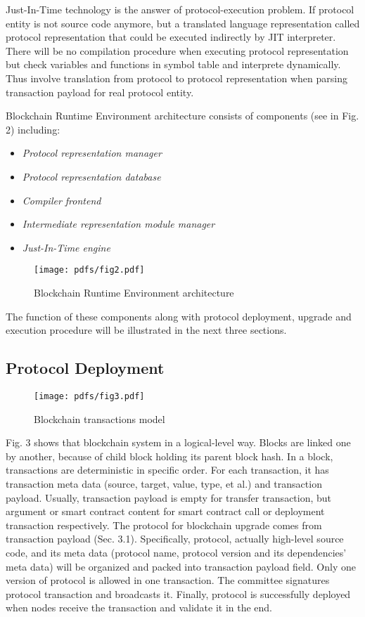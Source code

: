 \documentclass[sigplan,screen]{acmart}
\begin{document}
\begin{itemize}
    Just-In-Time technology is the answer of protocol-execution problem. If
    protocol entity is not source code anymore, but a translated language
    representation called protocol representation that could be executed
    indirectly by JIT interpreter. There will be no compilation procedure when
    executing protocol representation but check variables and functions in
    symbol table and interprete dynamically. Thus involve translation from
    protocol to protocol representation when parsing transaction payload for
    real protocol entity.
\end{itemize}

Blockchain Runtime Environment architecture consists of components (see in Fig.
2) including:
\begin{itemize}
  \item \textit{Protocol representation manager}
  \item \textit{Protocol representation database}
  \item \textit{Compiler frontend}
  \item \textit{Intermediate representation module manager}
  \item \textit{Just-In-Time engine}
\end{itemize}

\begin{figure}
  \texttt{[image: pdfs/fig2.pdf]}
  \caption{Blockchain Runtime Environment architecture}
\end{figure}

The function of these components along with protocol deployment, upgrade and
execution procedure will be illustrated in the next three sections.

\subsection{Protocol Deployment}

\begin{figure}
  \texttt{[image: pdfs/fig3.pdf]}
  \caption{Blockchain transactions model}
\end{figure}

Fig. 3 shows that blockchain system in a logical-level way. Blocks are linked
one by another, because of child block holding its parent block hash. In a
block, transactions are deterministic in specific order. For each transaction,
it has transaction meta data (source, target, value, type, et al.) and
transaction payload. Usually, transaction payload is empty for transfer
transaction, but argument or smart contract content for smart contract call
or deployment transaction respectively.
The protocol for blockchain upgrade comes from transaction payload
(Sec. 3.1). Specifically, protocol, actually high-level source
code, and its meta data (protocol name, protocol version and its dependencies'
meta data) will be organized and packed into transaction payload field.
Only one version of protocol is allowed in one transaction. The committee
signatures protocol transaction and broadcasts it. Finally, protocol
is successfully deployed when nodes receive the transaction and validate it in
the end.
\end{document}
